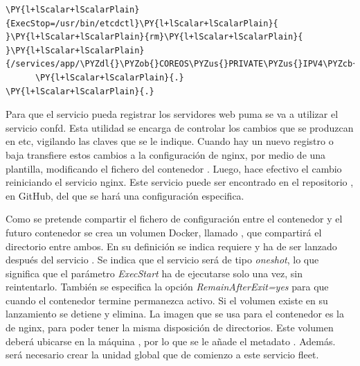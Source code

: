 \begin{codelisting}
\begin{Verbatim}[fontsize=\relsize{-2.5},fontseries=b,commandchars=\\\{\}]
      \PY{l+lScalar+lScalarPlain}{ExecStop=/usr/bin/etcdctl}\PY{l+lScalar+lScalarPlain}{ }\PY{l+lScalar+lScalarPlain}{rm}\PY{l+lScalar+lScalarPlain}{ }\PY{l+lScalar+lScalarPlain}{/services/app/\PYZdl{}\PYZob{}COREOS\PYZus{}PRIVATE\PYZus{}IPV4\PYZcb{}}
      \PY{l+lScalar+lScalarPlain}{.}
\PY{l+lScalar+lScalarPlain}{.}
\end{Verbatim}
\end{codelisting}

Para que el servicio  pueda registrar los servidores web puma se va a utilizar el servicio confd. Esta utilidad se encarga de controlar los cambios que se produzcan en etc, vigilando las claves que se le indique. Cuando hay un nuevo registro o baja transfiere estos cambios a la configuración de nginx, por medio de una plantilla, modificando el fichero  del contenedor . Luego, hace efectivo el cambio reiniciando el servicio nginx. Este servicio puede ser encontrado en el repositorio , en GitHub, del que se hará una configuración especifica.

Como se pretende compartir el fichero de configuración  entre el contenedor  y el futuro contenedor  se crea un volumen Docker, llamado , que compartirá el directorio  entre ambos. En su definición se indica requiere y ha de ser lanzado después del servicio . Se indica que el servicio será de tipo \textit{oneshot}, lo que significa que el parámetro \textit{ExecStart} ha de ejecutarse solo una vez, sin reintentarlo. También se especifica la opción \textit{RemainAfterExit=yes} para que cuando el contenedor termine permanezca activo. Si el volumen existe en su lanzamiento se detiene y elimina. La imagen que se usa para el contenedor es la de nginx, para poder tener la misma disposición de directorios. Este volumen deberá ubicarse en la máquina , por lo que se le añade el metadato . Además. será necesario crear la unidad global  que de comienzo a este servicio fleet.

